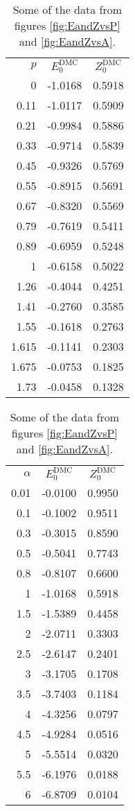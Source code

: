 \begin{table}[H]
	\begin{minipage}{.5\linewidth}
		\centering
		\caption*{$ \alpha = 1 $}
		\begin{tabular}{r | c | c} 
			$ p $ & $ E_0^\text{DMC} $ & $ Z_0^\text{DMC} $ \\ 
		 	\specialrule{.1em}{.05em}{.05em} 
0 & -1.0168 & 0.5918 \\
0.11 & -1.0117 & 0.5909 \\
0.21 & -0.9984 & 0.5886 \\
0.33 & -0.9714 & 0.5839 \\
0.45 & -0.9326 & 0.5769 \\
0.55 & -0.8915 & 0.5691 \\
0.67 & -0.8320 & 0.5569 \\
0.79 & -0.7619 & 0.5411 \\
0.89 & -0.6959 & 0.5248 \\
1 & -0.6158 & 0.5022 \\
1.26 & -0.4044 & 0.4251 \\
1.41 & -0.2760 & 0.3585 \\
1.55 & -0.1618 & 0.2763 \\
1.615 & -0.1141 & 0.2303 \\
1.675 & -0.0753 & 0.1825 \\
1.73 & -0.0458 & 0.1328 \\
		\end{tabular}
	\end{minipage}%
	\begin{minipage}{.5\linewidth}
		\centering
		\caption*{$ p = 0 $}
		\begin{tabular}{r | c | c} 
			$ \alpha $ & $ E_0^\text{DMC} $ & $ Z_0^\text{DMC} $ \\ 
			\specialrule{.1em}{.05em}{.05em} 
0.01 & -0.0100 & 0.9950 \\
0.1 & -0.1002 & 0.9511 \\
0.3 & -0.3015 & 0.8590 \\
0.5 & -0.5041 & 0.7743 \\
0.8 & -0.8107 & 0.6600 \\
1 & -1.0168 & 0.5918 \\
1.5 & -1.5389 & 0.4458 \\
2 & -2.0711 & 0.3303 \\
2.5 & -2.6147 & 0.2401 \\
3 & -3.1705 & 0.1708 \\
3.5 & -3.7403 & 0.1184 \\
4 & -4.3256 & 0.0797 \\
4.5 & -4.9284 & 0.0516 \\
5 & -5.5514 & 0.0320 \\
5.5 & -6.1976 & 0.0188 \\
6 & -6.8709 & 0.0104 \\
		\end{tabular}
	\end{minipage} 
	\caption{Some of the data from figures \ref{fig:EandZvsP} and \ref{fig:EandZvsA}.}
	\label{tab:EandZvsPandA}   
\end{table}

